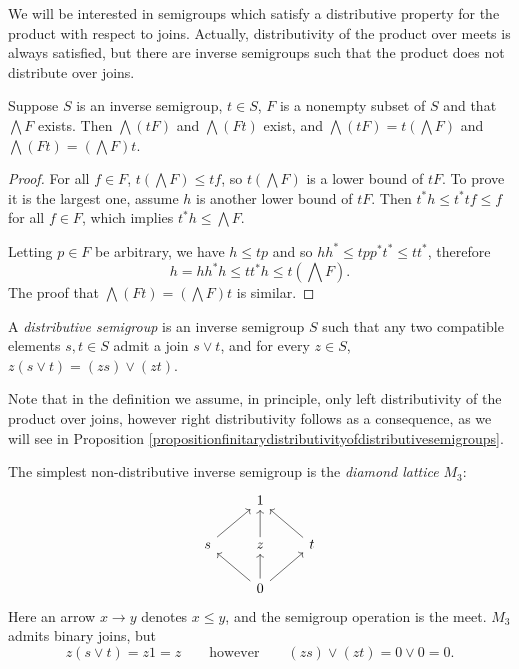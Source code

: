 We will be interested in semigroups which satisfy a distributive property for the product with respect to joins. Actually, distributivity of the product over meets is always satisfied, but there are inverse semigroups such that the product does not distribute over joins.

\begin{proposition}
Suppose $S$ is an inverse semigroup, $t\in S$, $F$ is a nonempty subset of $S$ and that $\bigwedge F$ exists. Then $\bigwedge(tF)$ and $\bigwedge(Ft)$ exist, and $\bigwedge(tF)=t\left(\bigwedge F\right)$ and $\bigwedge(Ft)=\left(\bigwedge F\right)t$.
\end{proposition}
\begin{proof}
For all $f\in F$, $t(\bigwedge F)\leq tf$, so $t\left(\bigwedge F\right)$ is a lower bound of $tF$. To prove it is the largest one, assume $h$ is another lower bound of $tF$. Then $t^*h\leq t^*tf\leq f$ for all $f\in F$, which implies $t^*h\leq\bigwedge F$.

Letting $p\in F$ be arbitrary, we have $h\leq tp$ and so $hh^*\leq tpp^*t^*\leq tt^*$, therefore
\[h=hh^*h\leq tt^*h\leq t\left(\bigwedge F\right).\]
The proof that $\bigwedge(Ft)=\left(\bigwedge F\right)t$ is similar.\qedhere
\end{proof}

\begin{definition}[\cite{MR3077869}]\label{definitiondistributivesemigroup}
A \emph{distributive semigroup} is an inverse semigroup $S$ such that any two compatible elements $s,t\in S$ admit a join $s\lor t$, and for every $z\in S$, $z(s\lor t)=(zs)\lor (zt)$.
\end{definition}

Note that in the definition we assume, in principle, only left distributivity of the product over joins, however right distributivity follows as a consequence, as we will see in Proposition \ref{propositionfinitarydistributivityofdistributivesemigroups}.

\begin{example}
The simplest non-distributive inverse semigroup is the \emph{diamond lattice} $M_3$:
\[\begin{tikzcd}
&1&\\
s\arrow[ur]&z\arrow[u]&t\arrow[ul]\\
&0\arrow[ul]\arrow[u]\arrow[ur]&
\end{tikzcd}\]
Here an arrow $x\to y$ denotes $x\leq y$, and the semigroup operation is the meet. $M_3$ admits binary joins, but
\[z(s\lor t)=z1=z\qquad\text{however}\qquad(zs)\lor(zt)=0\lor 0=0.\]
\end{example}

